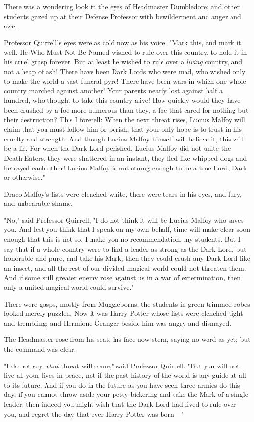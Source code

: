 There was a wondering look in the eyes of Headmaster Dumbledore; and other
students gazed up at their Defense Professor with bewilderment and anger and
awe.

Professor Quirrell's eyes were as cold now as his voice. "Mark this, and mark
it well. He-Who-Must-Not-Be-Named wished to rule over this country, to hold it
in his cruel grasp forever. But at least he wished to rule over a \emph{living}
country, and not a heap of ash! There have been Dark Lords who were mad, who
wished only to make the world a vast funeral pyre! There have been wars in
which one whole country marched against another! Your parents nearly lost
against half a hundred, who thought to take this country alive! How quickly
would they have been crushed by a foe more numerous than they, a foe that cared
for nothing but their destruction? This I foretell: When the next threat rises,
Lucius Malfoy will claim that you must follow him or perish, that your only
hope is to trust in his cruelty and strength. And though Lucius Malfoy himself
will believe it, this will be a lie. For when the Dark Lord perished, Lucius
Malfoy did not unite the Death Eaters, they were shattered in an instant, they
fled like whipped dogs and betrayed each other! Lucius Malfoy is not strong
enough to be a true Lord, Dark or otherwise."

Draco Malfoy's fists were clenched white, there were tears in his eyes, and
fury, and unbearable shame.

"No," said Professor Quirrell, "I do not think it will be Lucius Malfoy who
saves you. And lest you think that I speak on my own behalf, time will make
clear soon enough that this is not so. I make you no recommendation, my
students. But I say that if a whole country were to find a leader as strong as
the Dark Lord, but honorable and pure, and take his Mark; then they could crush
any Dark Lord like an insect, and all the rest of our divided magical world
could not threaten them. And if some still greater enemy rose against us in a
war of extermination, then only a united magical world could survive."

There were gasps, mostly from Muggleborns; the students in green-trimmed robes
looked merely puzzled. Now it was Harry Potter whose fists were clenched tight
and trembling; and Hermione Granger beside him was angry and dismayed.

The Headmaster rose from his seat, his face now stern, saying no word as yet;
but the command was clear.

"I do not say \emph{what} threat will come," said Professor Quirrell. "But you
will not live all your lives in peace, not if the past history of the world is
any guide at all to its future. And if you do in the future as you have seen
three armies do this day, if you cannot throw aside your petty bickering and
take the Mark of a single leader, then indeed you might wish that the Dark Lord
had lived to rule over you, and regret the day that ever Harry Potter was
born---"

